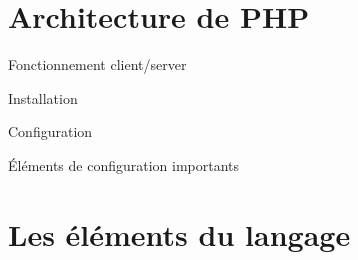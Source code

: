 \documentclass{beamer}
\begin{document}
\section{Architecture de PHP}

\begin{frame}{Fonctionnement client/server}

\end{frame}

\begin{frame}{Installation}

\end{frame}

\begin{frame}{Configuration}

\end{frame}

\begin{frame}{Éléments de configuration importants}

\end{frame}

\section{Les éléments du langage}


\end{document}
